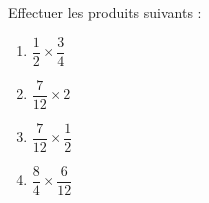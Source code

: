 
\begin{exercice}\label{exosmath-0882}

    Effectuer les produits suivants :
    \begin{multicols}{2}
        \begin{enumerate}
            \item
                \( \dfrac{ 1 }{ 2 }\times \dfrac{ 3 }{ 4 }\)
            \item
                \( \dfrac{ 7 }{ 12 }\times 2\)
            \item
                \( \dfrac{ 7 }{ 12 }\times \dfrac{ 1 }{ 2 }\)
            \item
                \( \dfrac{ 8 }{ 4 }\times \dfrac{ 6 }{ 12 }\)
        \end{enumerate}
    \end{multicols}

\end{exercice}
